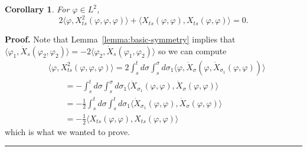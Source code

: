 \documentclass[a4paper,11pt,reqno]{article}
\newtheorem{corollary}[theorem]{Corollary}
\newenvironment{proof}[1][Proof]{\textbf{#1.} }{\ \rule{0.5em}{0.5em}}
\begin{document}
\begin{corollary} For $\varphi \in L^2$,
\label{cor:more-symmetry}
$$
2 \langle \varphi, X^2_{ts}(\varphi,\varphi,\varphi)\rangle
+   \langle X_{ts}(\varphi,\varphi), X_{ts}(\varphi,\varphi)\rangle = 0.
$$  
\end{corollary}
\begin{proof}
Note that Lemma~\ref{lemma:basic-symmetry} implies that
$
\langle \varphi_1 , \dot X_s(\varphi_2,\varphi_2) \rangle  =
-2 \langle \varphi_2 , \dot X_s(\varphi_1,\varphi_2) \rangle 
$
so  we can compute
  \begin{equation}
    \label{eq:cons-law-3}
    \begin{split}
  & \langle \varphi, X^2_{ts}(\varphi,\varphi,\varphi)\rangle = 
2 \int_s^t d\sigma \int_s^\sigma  d\sigma_1  
  \langle \varphi, \dot X_\sigma(\varphi,\dot
  X_{\sigma_1}(\varphi,\varphi))\rangle 
\\ & \qquad 
=- 
\int_s^t d\sigma \int_s^\sigma  d\sigma_1  
  \langle \dot
  X_{\sigma_1}(\varphi,\varphi), \dot X_\sigma(\varphi,\varphi)\rangle        
\\ & \qquad 
=- \frac12
\int_s^t d\sigma \int_s^t  d\sigma_1  
  \langle \dot
  X_{\sigma_1}(\varphi,\varphi), \dot X_\sigma(\varphi,\varphi)\rangle        
\\ & \qquad 
=- \frac12
  \langle 
  X_{ts}(\varphi,\varphi),  X_{ts}(\varphi,\varphi)\rangle        
    \end{split}
  \end{equation}
which is what we wanted to prove.
\end{proof}
\end{document}
